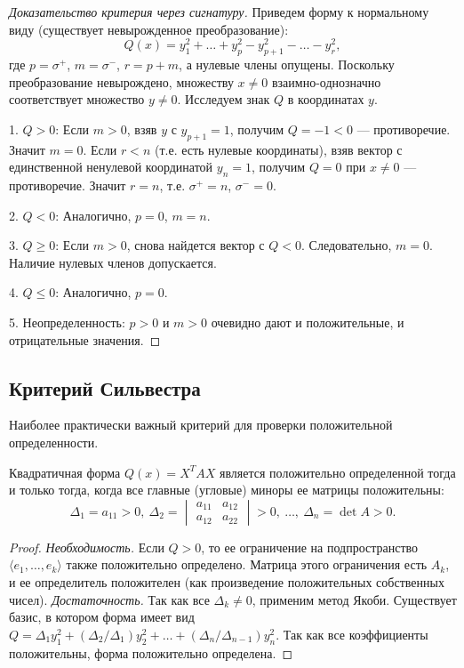 \documentclass[12pt]{article}
\begin{document}
\begin{proof}[Доказательство критерия через сигнатуру]
Приведем форму к нормальному виду (существует невырожденное преобразование):
\[
Q(x) = y_1^2 + \dots + y_p^2 - y_{p+1}^2 - \dots - y_r^2,
\]
где $p=\sigma^+$, $m=\sigma^-$, $r=p+m$, а нулевые члены опущены. Поскольку преобразование невырождено, множеству $x\neq0$ взаимно-однозначно соответствует множество $y\neq0$. Исследуем знак $Q$ в координатах $y$.

1. $Q>0$: Если $m>0$, взяв $y$ с $y_{p+1}=1$, получим $Q=-1<0$ — противоречие. Значит $m=0$. Если $r<n$ (т.е. есть нулевые координаты), взяв вектор с единственной ненулевой координатой $y_n=1$, получим $Q=0$ при $x\neq0$ — противоречие. Значит $r=n$, т.е. $\sigma^+=n$, $\sigma^-=0$.

2. $Q<0$: Аналогично, $p=0$, $m=n$.

3. $Q\ge0$: Если $m>0$, снова найдется вектор с $Q<0$. Следовательно, $m=0$. Наличие нулевых членов допускается.

4. $Q\le0$: Аналогично, $p=0$.

5. Неопределенность: $p>0$ и $m>0$ очевидно дают и положительные, и отрицательные значения.
\end{proof}

\subsection{Критерий Сильвестра}
Наиболее практически важный критерий для проверки положительной определенности.

\begin{theorem}
Квадратичная форма $Q(x) = X^T A X$ является положительно определенной тогда и только тогда, когда все главные (угловые) миноры ее матрицы положительны:
\[
\Delta_1 = a_{11} > 0,\ \Delta_2 = \begin{vmatrix} a_{11} & a_{12} \\ a_{12} & a_{22} \end{vmatrix} > 0,\ \dots,\ \Delta_n = \det A > 0.
\]
\end{theorem}

\begin{proof}
\textit{Необходимость.} Если $Q>0$, то ее ограничение на подпространство $\langle e_1,\dots,e_k\rangle$ также положительно определено. Матрица этого ограничения есть $A_k$, и ее определитель положителен (как произведение положительных собственных чисел).
\textit{Достаточность.} Так как все $\Delta_k \neq 0$, применим метод Якоби. Существует базис, в котором форма имеет вид $Q = \Delta_1 y_1^2 + (\Delta_2/\Delta_1) y_2^2 + \dots + (\Delta_n/\Delta_{n-1}) y_n^2$. Так как все коэффициенты положительны, форма положительно определена.
\end{proof}
\end{document}
